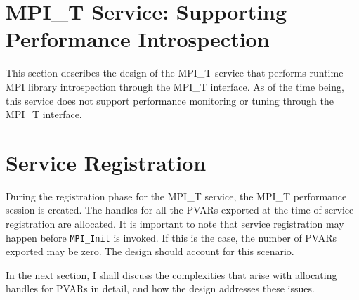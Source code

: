 \section {MPI\_T Service: Supporting Performance Introspection}
This section describes the design of the MPI\_T service that performs runtime MPI library introspection through the MPI\_T interface. As of the time being, this service does not support performance monitoring or tuning through the MPI\_T interface. 
\section{Service Registration}
During the registration phase for the MPI\_T service, the MPI\_T performance session is created. The handles for all the PVARs exported at the time of service registration are allocated. It is important to note that service registration may happen before \verb+MPI_Init+ is invoked. If this is the case, the number of PVARs exported may be zero. The design should account for this scenario.
\par In the next section, I shall discuss the complexities that arise with allocating handles for PVARs in detail, and how the design addresses these issues.
